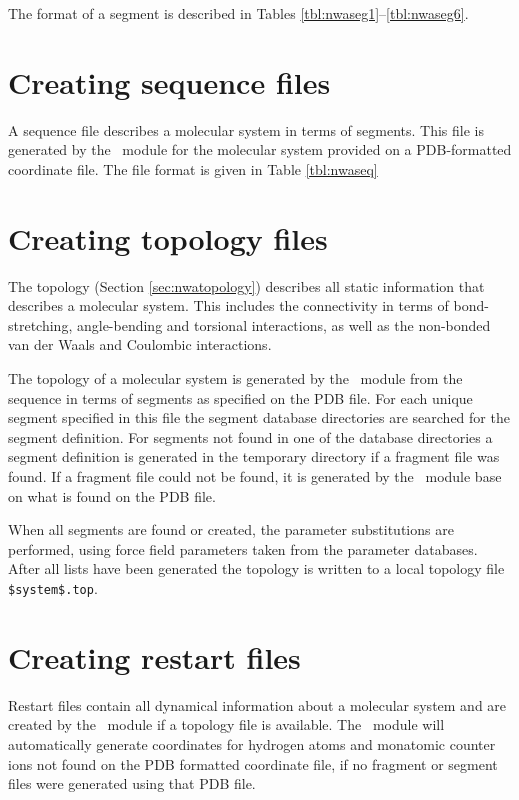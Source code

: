 The format of a segment is
described in Tables \ref{tbl:nwaseg1}--\ref{tbl:nwaseg6}.

\section{Creating sequence files}
A sequence file describes a molecular system in terms of segments. This
file is generated by the \prepare\ module for the molecular system
provided on a PDB-formatted coordinate file.
The file format is given in Table \ref{tbl:nwaseq}

\section{Creating topology files}
\label{sec:nwanwtop}

The topology (Section \ref{sec:nwatopology}) describes all static information
that describes a molecular system. This includes the connectivity in
terms of bond-stretching, angle-bending and torsional interactions, as well as
the non-bonded van der Waals and Coulombic interactions.

The topology of a molecular system is generated by the \prepare\ module
from the sequence in terms of segments as specified on the PDB file.
For each unique segment specified in this file the 
segment database directories are searched for the segment definition. 
For segments not found in one of the database directories a segment definition
is generated in the temporary directory if a fragment file was found.
If a fragment file could not be found, it is generated by the \prepare\ module
base on what is found on the PDB file.

When all segments are found or created, the parameter substitutions are 
performed, using force field parameters taken from the parameter 
databases. After all lists have been generated the
topology is written to a local topology file \verb+$system$.top+.

\section{Creating restart files}
\label{sec:nwanwrst}

Restart files contain all dynamical information about a molecular
system and are created by the \prepare\ module if a topology file
is available. The \prepare\ module will automatically generate
coordinates for hydrogen atoms and monatomic counter ions
not found on the PDB formatted coordinate file, if no fragment or
segment files were generated using that PDB file.

